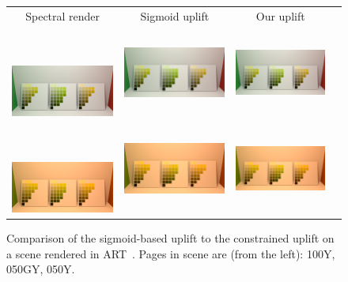 \begin{figure}[ht]
	\centering
	{\sffamily
		\begin{tabular}{cccc}
			Spectral render & Sigmoid uplift & Our uplift
			\vspace{1em} \\
			\raisebox{0.5cm}[0pt][0pt]{\parbox[c][0pt][c]{0cm}{\hspace{-1.5em}\\[10pt]}\par}
			\includegraphics[width=.29\linewidth]{img/results_art_original_d65.png}
			&
			\includegraphics[width=.29\linewidth]{img/results_art_sigmoids_d65.png}
			& 
			\includegraphics[width=.29\linewidth]{img/results_art_constrained_d65.png}
			\vspace{0.5em} \\
			\raisebox{0.5cm}[0pt][0pt]{\parbox[c][0pt][c]{0cm}{\hspace{-1.5em}\\[10pt]}\par}
			\includegraphics[width=.29\linewidth]{img/results_art_original_fl12.png}
			&
			\includegraphics[width=.29\linewidth]{img/results_art_sigmoids_fl12.png}
			&
			\includegraphics[width=.29\linewidth]{img/results_art_constrained_fl12.png}
		\end{tabular}
	}
	\caption{Comparison of the sigmoid-based uplift to the constrained uplift on a scene rendered in ART~\cite{ART}. Pages in scene are (from the left): 100Y, 050GY, 050Y.}
	\label{fig:results_art_scene}
\end{figure}

